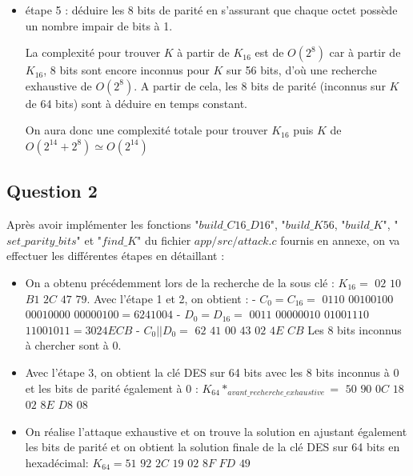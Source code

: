 \documentclass[11pt]{article}
\begin{document}
\begin{itemize}
	\item étape 5 : déduire les 8 bits de parité en s'assurant que chaque octet possède un nombre impair de bits à 1. \newline
	
	La complexité pour trouver $K$ à partir de $K_{16}$ est de $O(2^8)$ car à partir de $K_{16}$, 8 bits sont encore inconnus pour $K$ sur 56 bits, d'où une recherche exhaustive de $O(2^8)$. A partir de cela, les 8 bits de parité (inconnus sur $K$ de 64 bits) sont à déduire en temps constant. \newline
	
	On aura donc une complexité totale pour trouver $K_{16}$ puis $K$ de $O(2^{14}+2^{8}) \simeq O(2^{14})$
	
	
\end{itemize}

\subsection{Question 2}

Après avoir implémenter les fonctions "$build\_C16\_D16$", "$build\_K56$, "$build\_K$", "$set\_parity\_bits$" et "$find\_K$" du fichier $app/src/attack.c$ fournis en annexe, on va effectuer les différentes étapes en détaillant : 

\begin{itemize}

\item On a obtenu précédemment lors de la recherche de la sous clé : $K_{16}= $ $02$ $10$ $B1$ $2C$ $47$ $79$. \newline \newline
Avec l'étape 1 et 2, on obtient : \newline 
- $C_{0}=C_{16}=$ $0110$ $00100100$ $00010000$ $00000100= 6241004$ \newline 
- $D_{0}=D_{16}=$ $0011$ $00000010$ $01001110$ $11001011= 3024ECB$ \newline
- $C_{0}||D_{0}=$ $62$ $41$ $00$ $43$ $02$ $4E$ $CB$ \newline
Les 8 bits inconnus à chercher sont à $0$. \newline

\item Avec l'étape 3, on obtient la clé DES sur 64 bits avec les 8 bits inconnus à 0 et les bits de parité également à 0 : $K_{64}*_{avant\_recherche\_exhaustive}=$ $50$ $90$ $0C$ $18$ $02$ $8E$ $D8$ $08$ \newline

\item On réalise l'attaque exhaustive et on trouve la solution en ajustant également les bits de parité et on obtient la solution finale de la clé DES sur 64 bits en hexadécimal: \newline 
\color{red}
$K_{64}=51$ $92$ $2C$ $19$ $02$ $8F$ $FD$ $49$
\color{black}

\end{itemize}
\end{document}
